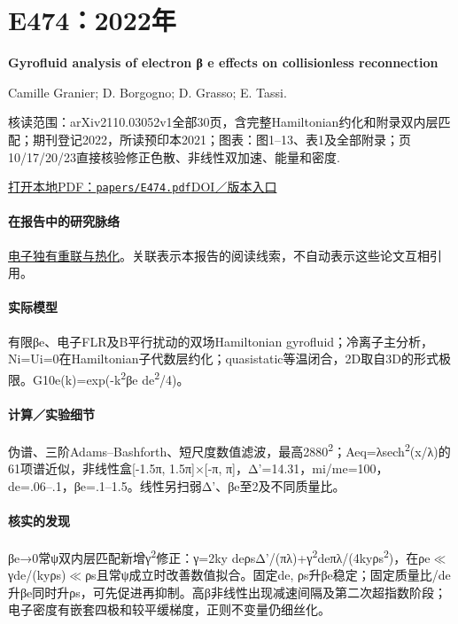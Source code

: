 \documentclass[UTF8,a4paper,11pt,openany,fontset=fandol]{ctexbook}
\begin{document}
\section{E474：2022年}\label{paper:E474}

\textbf{Gyrofluid analysis of electron β e effects on collisionless reconnection}\citep{E474}\

Camille Granier;  D. Borgogno;  D. Grasso;  E. Tassi.

\textsf{核读范围：}arXiv2110.03052v1全部30页，含完整Hamiltonian约化和附录双内层匹配；期刊登记2022，所读预印本2021；\textsf{图表：}图1–13、表1及全部附录；页10/17/20/23直接核验修正色散、非线性双加速、能量和密度.

\href{run:../papers/E474.pdf}{打开本地PDF：\texttt{papers/E474.pdf}}\quad\href{https://doi.org/10.1017/s0022377822000010}{DOI／版本入口}

\paragraph{在报告中的研究脉络}\hyperref[story:energy]{电子独有重联与热化}。关联表示本报告的阅读线索，不自动表示这些论文互相引用。

\paragraph{实际模型}有限βe、电子FLR及B平行扰动的双场Hamiltonian gyrofluid；冷离子主分析，Ni=Ui=0在Hamiltonian子代数层约化；quasistatic等温闭合，2D取自3D的形式极限。G10e(k)=exp(-k\textsuperscript{2}βe de\textsuperscript{2}/4)。

\paragraph{计算／实验细节}伪谱、三阶Adams–Bashforth、短尺度数值滤波，最高2880\textsuperscript{2}；Aeq=λsech\textsuperscript{2}(x/λ)的61项谱近似，非线性盒[-1.5π, 1.5π]×[-π, π]，Δ'=14.31，mi/me=100，de=.06–.1，βe=.1–1.5。线性另扫弱Δ'、βe至2及不同质量比。

\paragraph{核实的发现}βe→0常ψ双内层匹配新增γ\textsuperscript{2}修正：γ=2ky deρsΔ'/(πλ)+γ\textsuperscript{2}deπλ/(4kyρs\textsuperscript{2})，在ρe\ensuremath{\ll}γde/(kyρs)\ensuremath{\ll}ρs且常ψ成立时改善数值拟合。固定de, ρs升βe稳定；固定质量比/de升βe同时升ρs，可先促进再抑制。高β非线性出现减速间隔及第二次超指数阶段；电子密度有嵌套四极和较平缓梯度，正则不变量仍细丝化。
\end{document}
